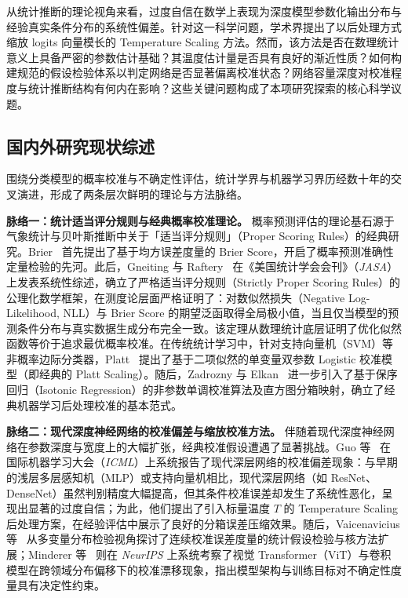 从统计推断的理论视角来看，过度自信在数学上表现为深度模型参数化输出分布与经验真实条件分布的系统性偏差。针对这一科学问题，学术界提出了以后处理方式缩放 logits 向量模长的 Temperature Scaling 方法。然而，该方法是否在数理统计意义上具备严密的参数估计基础？其温度估计量是否具有良好的渐近性质？如何构建规范的假设检验体系以判定网络是否显著偏离校准状态？网络容量深度对校准程度与统计推断结构有何内在影响？这些关键问题构成了本项研究探索的核心科学议题。

\subsection{国内外研究现状综述}

围绕分类模型的概率校准与不确定性评估，统计学界与机器学习界历经数十年的交叉演进，形成了两条层次鲜明的理论与方法脉络。

\textbf{脉络一：统计适当评分规则与经典概率校准理论。}
概率预测评估的理论基石源于气象统计与贝叶斯推断中关于「适当评分规则」（Proper Scoring Rules）的经典研究。Brier~\cite{brier1950verification} 首先提出了基于均方误差度量的 Brier Score，开启了概率预测准确性定量检验的先河。此后，Gneiting 与 Raftery~\cite{gneiting2007strictly} 在《美国统计学会会刊》（\textit{JASA}）上发表系统性综述，确立了严格适当评分规则（Strictly Proper Scoring Rules）的公理化数学框架，在测度论层面严格证明了：对数似然损失（Negative Log-Likelihood, NLL）与 Brier Score 的期望泛函取得全局极小值，当且仅当模型的预测条件分布与真实数据生成分布完全一致。该定理从数理统计底层证明了优化似然函数等价于追求最优概率校准。在传统统计学习中，针对支持向量机（SVM）等非概率边际分类器，Platt~\cite{platt1999probabilistic} 提出了基于二项似然的单变量双参数 Logistic 校准模型（即经典的 Platt Scaling）。随后，Zadrozny 与 Elkan~\cite{zadrozny2002transforming} 进一步引入了基于保序回归（Isotonic Regression）的非参数单调校准算法及直方图分箱映射，确立了经典机器学习后处理校准的基本范式。

\textbf{脉络二：现代深度神经网络的校准偏差与缩放校准方法。}
伴随着现代深度神经网络在参数深度与宽度上的大幅扩张，经典校准假设遭遇了显著挑战。Guo 等~\cite{guo2017calibration} 在国际机器学习大会（\textit{ICML}）上系统报告了现代深层网络的校准偏差现象：与早期的浅层多层感知机（MLP）或支持向量机相比，现代深层网络（如 ResNet、DenseNet）虽然判别精度大幅提高，但其条件校准误差却发生了系统性恶化，呈现出显著的过度自信；为此，他们提出了引入标量温度 $T$ 的 Temperature Scaling 后处理方案，在经验评估中展示了良好的分箱误差压缩效果。随后，Vaicenavicius 等~\cite{vaicenavicius2019evaluating} 从多变量分布检验视角探讨了连续校准误差度量的统计假设检验与核方法扩展；Minderer 等~\cite{minderer2021revisiting} 则在 \textit{NeurIPS} 上系统考察了视觉 Transformer（ViT）与卷积模型在跨领域分布偏移下的校准漂移现象，指出模型架构与训练目标对不确定性度量具有决定性约束。

